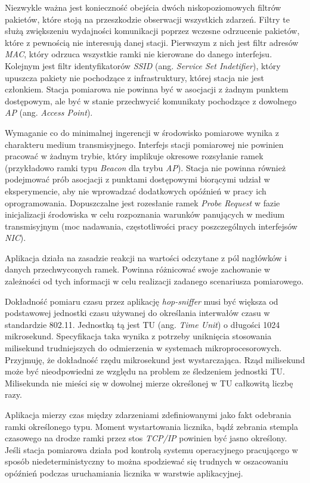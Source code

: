 Niezwykle ważna jest konieczność obejścia dwóch niskopoziomowych filtrów pakietów, które stoją na przeszkodzie obserwacji wszystkich zdarzeń. Filtry te służą zwiększeniu wydajności komunikacji poprzez wczesne odrzucenie pakietów, które z pewnością nie interesują danej stacji. Pierwszym z nich jest filtr adresów \emph{MAC}, który odrzuca wszystkie ramki nie kierowane do danego interfejsu. Kolejnym jest filtr identyfikatorów \emph{SSID} (ang. \emph{Service Set Indetifier}), który upuszcza pakiety nie pochodzące z infrastruktury, której stacja nie jest członkiem. Stacja pomiarowa nie powinna być w asocjacji z żadnym punktem dostępowym, ale być w stanie przechwycić komunikaty pochodzące z dowolnego \emph{AP} (ang. \emph{Access Point}). 

Wymaganie co do minimalnej ingerencji w środowisko pomiarowe wynika z charakteru medium transmisyjnego. Interfejs stacji pomiarowej nie powinien pracować w żadnym trybie, który implikuje okresowe rozsyłanie ramek (przykładowo ramki typu \emph{Beacon} dla trybu \emph{AP}). Stacja nie powinna również podejmować prób asocjacji z punktami dostępowymi biorącymi udział w eksperymencie, aby nie wprowadzać dodatkowych opóźnień w pracy ich oprogramowania. Dopuszczalne jest rozesłanie ramek \emph{Probe Request} w fazie inicjalizacji środowiska w celu rozpoznania warunków panujących w medium transmisyjnym (moc nadawania, częstotliwości pracy poszczególnych interfejsów \emph{NIC}). 

Aplikacja działa na zasadzie reakcji na wartości odczytane z pól nagłówków i danych przechwyconych ramek. Powinna różnicować swoje zachowanie w zależności od tych informacji w celu realizacji zadanego scenariusza pomiarowego.

Dokładność pomiaru czasu przez aplikację \emph{hop-sniffer} musi być większa od podstawowej jednostki czasu używanej do określania interwałów czasu w standardzie 802.11. Jednostką tą jest TU (ang. \emph{Time Unit}) o długości 1024 mikrosekund. Specyfikacja taka wynika z potrzeby uniknięcia stosowania milisekund trudniejszych do odmierzenia w systemach mikroprocesorowych. Przyjmuję, że dokładność rzędu mikrosekund jest wystarczająca. Rząd milisekund może być nieodpowiedni ze względu na problem ze śledzeniem jednostki TU. Milisekunda nie mieści się w dowolnej mierze określonej w TU całkowitą liczbę razy. 

Aplikacja mierzy czas między zdarzeniami zdefiniowanymi jako fakt odebrania ramki określonego typu. Moment wystartowania licznika, bądź zebrania stempla czasowego na drodze ramki przez stos \emph{TCP/IP} powinien być jasno określony. Jeśli stacja pomiarowa działa pod kontrolą systemu operacyjnego pracującego w sposób niedeterministyczny to można spodziewać się trudnych w oszacowaniu opóźnień podczas uruchamiania licznika w warstwie aplikacyjnej.  



